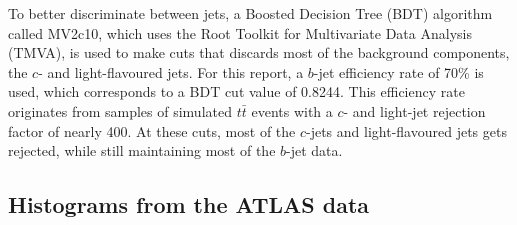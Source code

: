 \documentclass[12pt,a4paper]{article}
\begin{document}
To better discriminate between jets, a Boosted Decision Tree (BDT) algorithm
called MV2c10, which uses the Root Toolkit for Multivariate Data Analysis
(TMVA), is used to make cuts that discards most of the background components,
the $c$- and light-flavoured jets. For this report, a $b$-jet efficiency rate of
70\% is used, which corresponds to a BDT cut value of 0.8244. This efficiency
rate originates from samples of simulated $t\bar t$ events with a $c$- and
light-jet rejection factor of nearly 400\cite{ATL-PHYS-PUB-2016-012}. At these
cuts, most of the $c$-jets and light-flavoured jets gets rejected, while still
maintaining most of the $b$-jet data.


\subsection{Histograms from the ATLAS data}
\end{document}

